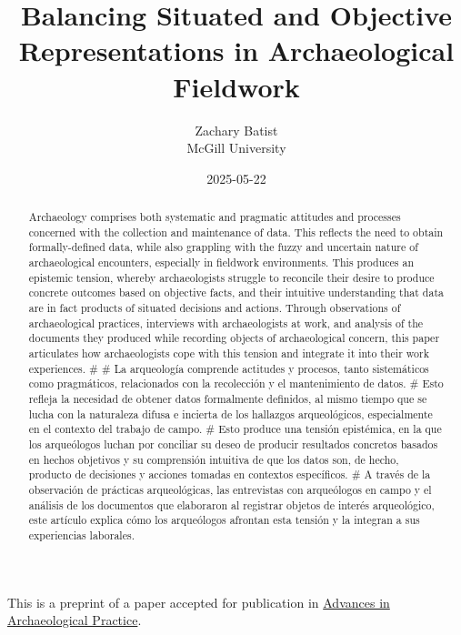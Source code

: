 \documentclass[
]{article}
\title{Balancing Situated and Objective Representations in
Archaeological Fieldwork}
\author{
      {Zachary
Batist \orcidlink{0000-0003-0435-508X} \href{mailto:zachary.batist@mcgill.ca}{\Letter}} \\
          McGill University
     \\
  }
\date{2025-05-22}
\begin{document}
\maketitle
\begin{abstract}
Archaeology comprises both systematic and pragmatic attitudes and
processes concerned with the collection and maintenance of data. This
reflects the need to obtain formally-defined data, while also grappling
with the fuzzy and uncertain nature of archaeological encounters,
especially in fieldwork environments. This produces an epistemic
tension, whereby archaeologists struggle to reconcile their desire to
produce concrete outcomes based on objective facts, and their intuitive
understanding that data are in fact products of situated decisions and
actions. Through observations of archaeological practices, interviews
with archaeologists at work, and analysis of the documents they produced
while recording objects of archaeological concern, this paper
articulates how archaeologists cope with this tension and integrate it
into their work experiences. \# \# La arqueología comprende actitudes y
procesos, tanto sistemáticos como pragmáticos, relacionados con la
recolección y el mantenimiento de datos. \# Esto refleja la necesidad de
obtener datos formalmente definidos, al mismo tiempo que se lucha con la
naturaleza difusa e incierta de los hallazgos arqueológicos,
especialmente en el contexto del trabajo de campo. \# Esto produce una
tensión epistémica, en la que los arqueólogos luchan por conciliar su
deseo de producir resultados concretos basados en hechos objetivos y su
comprensión intuitiva de que los datos son, de hecho, producto de
decisiones y acciones tomadas en contextos específicos. \# A través de
la observación de prácticas arqueológicas, las entrevistas con
arqueólogos en campo y el análisis de los documentos que elaboraron al
registrar objetos de interés arqueológico, este artículo explica cómo
los arqueólogos afrontan esta tensión y la integran a sus experiencias
laborales.
\end{abstract}


\begin{tcolorbox}[enhanced jigsaw, colframe=quarto-callout-note-color-frame, title=\textcolor{quarto-callout-note-color}{\faInfo}\hspace{0.5em}{Note}, breakable, opacitybacktitle=0.6, toprule=.15mm, colback=white, leftrule=.75mm, opacityback=0, bottomtitle=1mm, colbacktitle=quarto-callout-note-color!10!white, toptitle=1mm, rightrule=.15mm, arc=.35mm, titlerule=0mm, coltitle=black, bottomrule=.15mm, left=2mm]

This is a preprint of a paper accepted for publication in
\href{https://www.cambridge.org/core/journals/advances-in-archaeological-practice}{Advances
in Archaeological Practice}.

\end{tcolorbox}
\end{document}
